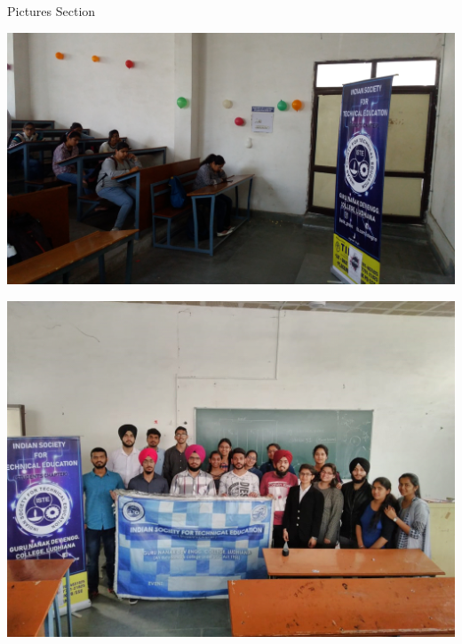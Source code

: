 \documentclass[12pt, a4 paper]{article}
\begin{document}
\begin{center}
\Huge Pictures Section

\medskip

\includegraphics[width=\linewidth]{image6.jpg}

\medskip

\includegraphics[width=\linewidth]{image5.png}

\end{center}

\newpage
\end{document}
